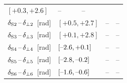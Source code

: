 \begin{table}[htbp]
\begin{tabular}{lllcc}
{                                                 $[\text{+0.3},   \text{+2.6}]$}    &  --  &  --  \\
    $\delSperp[2]$~[rad]  &   \multicolumn{2}{l}{%
                                                 $[\text{+0.5},   \text{+2.7}]$}    &  --  &  --  \\
    $\delSperp[3]$~[rad]  &   \multicolumn{2}{l}{%
                                                 $[\text{+0.1},   \text{+2.8}]$}    &  --  &  --  \\
    $\delSperp[4]$~[rad]  &   \multicolumn{2}{l}{%
                                                 $[\text{\tm2.6}, \text{+0.1}]$}    &  --  &  --  \\
    $\delSperp[5]$~[rad]  &   \multicolumn{2}{l}{%
                                                 $[\text{\tm2.8}, \text{\tm0.2}]$}  &  --  &  --  \\
    $\delSperp[6]$~[rad]  &   \multicolumn{2}{l}{%
                                                 $[\text{\tm1.6}, \text{\tm0.6}]$}  &  --  &  --  \\
    \hline
  \end{tabular}
\end{table}

